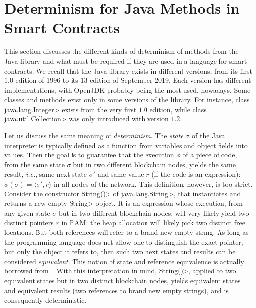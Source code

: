 \section{Determinism for Java Methods in Smart Contracts}\label{sec:determinism}

This section discusses the different kinds of determinism of methods from
the Java library and what must be required if they are used
in a language for smart contracts.
We recall that the Java library exists in different versions, from its first
$1.0$ edition of 1996 to its $13$ edition of September 2019.
Each version has different implementations, with OpenJDK probably being
the most used, nowadays. Some classes and methods exist only in some versions of the library.
For instance, class \<java.lang.Integer> exists from the very first $1.0$ edition,
while class \<java.util.Collection> was only introduced with version $1.2$.

Let us discuss the same meaning of \emph{determinism}.
The \emph{state} $\sigma$ of the Java interpreter is typically defined
as a function from variables and object fields into values.
Then the goal is to guarantee that the execution $\phi$ of a piece of code,
from the same state $\sigma$ but in two different blockchain nodes, yields the same result, \emph{i.e.},
same next state $\sigma'$ and same value $r$ (if the code is an expression):
$\phi(\sigma)=\langle\sigma',r\rangle$ in all nodes of the network.
This definition, however, is too strict. Consider the constructor
\<String()> of \<java.lang.String>, that instantiates and returns a new empty \<String>
object. It is an expression whose execution,
from any given state $\sigma$ but in two different blockchain nodes,
will very likely yield two distinct
pointers $r$ in RAM: the heap allocation will likely
pick two distinct free locations.
But both references will refer to a brand new empty string.
As long as the programming language does not allow one to distinguish
the exact pointer, but only the object it refers to,
then such two next states and results can be considered \emph{equivalent}.
This notion of state and reference equivalence is actually borrowed
from~\cite{BanerjeeN05,BarthePR13}.
With this interpretation in mind, \<String()>, applied to two equivalent
states but in two distinct blockchain nodes,
yields equivalent states and equivalent results (two references to
brand new empty strings), and is consequently deterministic.

